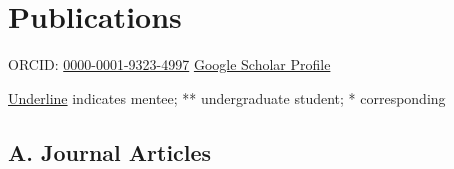 \documentclass[
  11pt,
  letterpaper,
  DIV=11,
  numbers=noendperiod]{scrartcl}
\providecommand{\tightlist}{%
  \setlength{\itemsep}{0pt}\setlength{\parskip}{0pt}}
\begin{document}
\section{Publications}\label{publications}

\apptocmd{\tightlist}{\setlength{\itemsep}{4pt}}{}{}

ORCID: \href{https://orcid.org/0000-0001-9323-4997}{0000-0001-9323-4997}
\textbar{}
\href{https://scholar.google.com/citations?user=9_K4ekoAAAAJ&hl=en&authuser=5}{Google
Scholar Profile}

\underline{Underline} indicates mentee; ** undergraduate student; *
corresponding

\subsection{A. Journal Articles}\label{a.-journal-articles}
\end{document}
